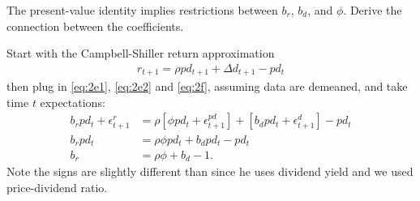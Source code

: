 \begin{answer}[Part g]
The present-value identity implies restrictions between $b_r$, $b_d$, and $\phi$. Derive the connection between the coefficients.
\end{answer}

Start with the Campbell-Shiller return approximation
\begin{align}
r_{t+1} = \rho pd_{t+1} + \Delta d_{t+1} - pd_t
\end{align}
then plug in \eqref{eq:2e1}, \eqref{eq:2e2} and \eqref{eq:2f}, assuming data are demeaned, and take time $t$ expectations:
\begin{align}
b_{r}pd_{t}+\epsilon_{t+1}^{r}	&=\rho\left[\phi pd_{t}+\epsilon_{t+1}^{pd}\right]+\left[b_{d}pd_{t}+\epsilon_{t+1}^{d}\right]-pd_{t} \\
b_{r}pd_{t}	&=\rho\phi pd_{t}+b_{d}pd_{t}-pd_{t}\\
b_{r}	&=\rho\phi+b_{d}-1.
\end{align}
Note the signs are slightly different than \cite{cochrane2008} since he uses dividend yield and we used price-dividend ratio.